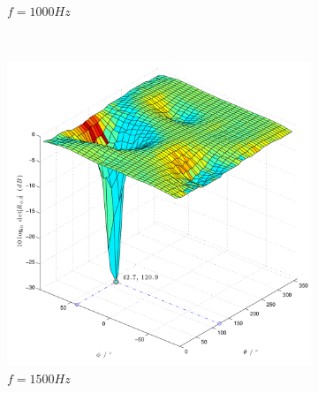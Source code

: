 \begin{figure}
\begin{subfigure}[b]{0.48\textwidth}
                \caption{$f=1000Hz$}
                \label{fig:Sim_sine_f_1000_Phi_45_Theta_120_dB_SNR_100dB}
        \end{subfigure}
        ~ %
        \begin{subfigure}[b]{0.48\textwidth}
                \centering
                \includegraphics[width=\textwidth]{images/02_Konzeptionierung/Sim_sine_f_1500_Phi_45_Theta_120_dB_SNR_100dB}
                \caption{$f=1500Hz$}
                \label{fig:Sim_sine_f_1500_Phi_45_Theta_120_dB_SNR_100dB}
        \end{subfigure}
                ~ %
        \begin{subfigure}[b]{0.48\textwidth}
                \centering

\end{subfigure}
\end{figure}
